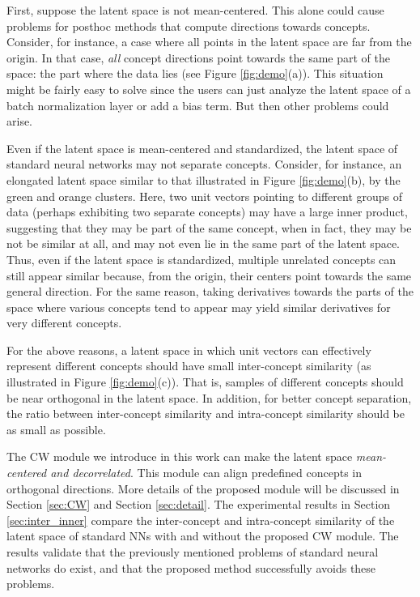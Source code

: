 \documentclass{article}
\begin{document}
First, suppose the latent space is not mean-centered. This alone could cause problems for posthoc methods that compute directions towards concepts. Consider, for instance, a case where all points in the latent space are far from the origin. In that case, \textit{all} concept directions point towards the same part of the space: the part where the data lies (see Figure \ref{fig:demo}(a)).
This situation might be fairly easy to solve since the users can just analyze the latent space of a batch normalization layer or add a bias term. But then other problems could arise.

Even if the latent space is mean-centered and standardized, the latent space of standard neural networks may not separate concepts. Consider, for instance, an elongated latent space similar to that illustrated in Figure \ref{fig:demo}(b), by the green and orange clusters. Here, two unit vectors pointing to different groups of data (perhaps exhibiting two separate concepts) may have a large inner product, suggesting that they may be part of the same concept, when in fact, they may be not be similar at all, and may not even lie in the same part of the latent space. Thus, even if the latent space is standardized, multiple unrelated concepts can still appear similar because, from the origin, their centers point towards the same general direction. For the same reason, taking derivatives towards the parts of the space where various concepts tend to appear may yield similar derivatives for very different concepts.

For the above reasons, a latent space in which unit vectors can effectively represent different concepts should have small inter-concept similarity (as illustrated in Figure \ref{fig:demo}(c)). That is, samples of different concepts should be near orthogonal in the latent space. In addition, for better concept separation, the ratio between inter-concept similarity and intra-concept similarity should be as small as possible.

The CW module we introduce in this work can make the latent space \textit{mean-centered and decorrelated}. This module can align predefined concepts in orthogonal directions. More details of the proposed module will be discussed in Section \ref{sec:CW} and Section \ref{sec:detail}. The experimental results in Section \ref{sec:inter_inner} compare the inter-concept and intra-concept similarity of the latent space of standard NNs with and without the proposed CW module. The results validate that the previously mentioned problems of standard neural networks do exist, and that the proposed method successfully avoids these problems.
\end{document}
